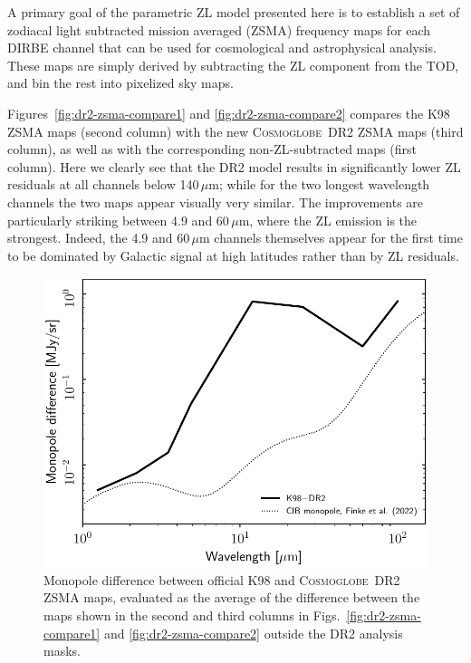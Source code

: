 \documentclass[twocolumn]{aa}
\newcommand{\cosmoglobe}{\textsc{Cosmoglobe}}
\begin{document}
A primary goal of the parametric ZL model presented here is to
establish a set of zodiacal light subtracted mission averaged (ZSMA)
frequency maps for each DIRBE channel that can be used for
cosmological and astrophysical analysis. These maps are simply derived
by subtracting the ZL component from the TOD, and bin the rest
into pixelized sky maps.

Figures~\ref{fig:dr2-zsma-compare1} and \ref{fig:dr2-zsma-compare2}
compares the K98 ZSMA maps (second column) with the new
\cosmoglobe\ DR2 ZSMA maps (third column), as well as with the
corresponding non-ZL-subtracted maps (first column). Here we clearly
see that the DR2 model results in significantly lower ZL residuals at
all channels below 140\,$\mu$m; while for the two longest wavelength
channels the two maps appear visually very similar. The improvements
are particularly striking between 4.9 and 60$\,\mu$m, where the ZL
emission is the strongest. Indeed, the 4.9 and 60$\,\mu$m channels
themselves appear for the first time to be dominated by Galactic
signal at high latitudes rather than by ZL residuals.

\begin{figure}
    \centering
    \includegraphics[width=\linewidth]{figs/zodi_mean_diff_DIRBE_DR2.pdf}
    \caption{Monopole difference between official K98 and
      \cosmoglobe\ DR2 ZSMA maps, evaluated as the average of the
      difference between the maps shown in the second and third
      columns in Figs.~\ref{fig:dr2-zsma-compare1} and
      \ref{fig:dr2-zsma-compare2} outside the DR2 analysis masks.}
    \label{fig:zsma_mean}
\end{figure}
\end{document}
